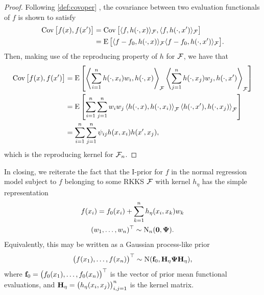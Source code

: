 \begin{proof}
  Following \cref{def:covoper} , the covariance between two evaluation functionals of $f$ is shown to satisfy 
  \begin{align*}
    \operatorname{Cov}\big[f(x),f(x')\big] 
    &= \operatorname{Cov}\big[\langle f,h(\cdot,x)\rangle_{{\mathcal F}}, \langle f,h(\cdot,x')\rangle_{{\mathcal F}} \big] \\
    &= \operatorname{E}\big[\langle f-f_0,h(\cdot,x)\rangle_{{\mathcal F}}\langle f-f_0,h(\cdot,x')\rangle_{{\mathcal F}} \big].
  \end{align*}
  Then, making use of the reproducing property of $h$ for ${\mathcal F}$, we have that
  \begin{align*}
    \operatorname{Cov}\big[f(x),f(x')\big]
    &= \operatorname{E} \left[ 
    \left\langle \sum_{i=1}^n h(\cdot,x_i)w_i, h(\cdot,x) \right\rangle_{{\mathcal F}} 
    \left\langle \sum_{j=1}^n h(\cdot,x_j)w_j, h(\cdot,x') \right\rangle_{{\mathcal F}} 
    \right] \\
    &= \operatorname{E} \left[ 
    \sum_{i=1}^n\sum_{j=1}^n w_iw_j \left\langle  h(\cdot,x), h(\cdot,x_i) \right\rangle_{{\mathcal F}} 
     \left\langle h(\cdot,x'), h(\cdot,x_j)\right\rangle_{{\mathcal F}} 
    \right] \\
    &= \sum_{i=1}^n\sum_{j=1}^n \psi_{ij} h(x,x_i) h(x',x_j),
  \end{align*}
  which is the reproducing kernel for ${\mathcal F}_n$.
\end{proof}

In closing, we reiterate the fact that the I-prior for $f$ in the normal regression model subject to $f$ belonging to some RKKS ${\mathcal F}$ with kernel $h_\eta$ has the simple representation
\begin{align}\label{eq:iprior2}
  \begin{gathered}
    f(x_i) = f_0(x_i) + \sum_{k=1}^n h_\eta(x_i,x_k)w_k \\
    (w_1,\dots,w_n)^\top \sim \operatorname{N}_n({\mathbf 0},{\bm\Psi}).
  \end{gathered}
\end{align}
Equivalently, this may be written as a Gaussian process-like prior 
\begin{align}\label{eq:iprior3}
  \big(f(x_1),\dots,f(x_n) \big)^\top \sim \operatorname{N}({\mathbf f}_0,{\mathbf H}_\eta{\bm\Psi}{\mathbf H}_\eta),
\end{align}
where ${\mathbf f}_0 = \big(f_0(x_1),\dots,f_0(x_n) \big)^\top$ is the vector of prior mean functional evaluations, and ${\mathbf H}_\eta = \big(h_\eta(x_i,x_j)\big)_{i,j=1}^n$ is the kernel matrix.
